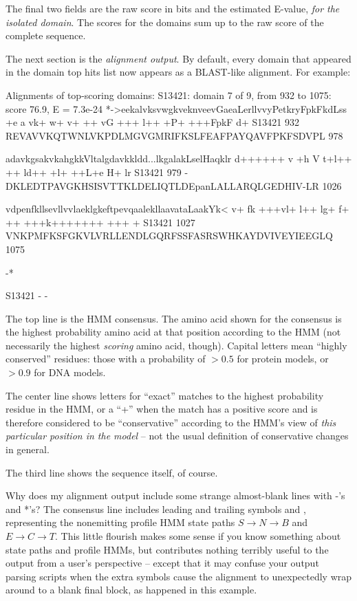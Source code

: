 The final two fields are the raw score in bits and the estimated
E-value, \emph{for the isolated domain}.  The scores for the domains
sum up to the raw score of the complete sequence.

The next section is the \emph{ alignment output}. By default, every
domain that appeared in the domain top hits list now appears as a
BLAST-like alignment. For example:

\begin{sreoutput}
Alignments of top-scoring domains:
S13421: domain 7 of 9, from 932 to 1075: score 76.9, E = 7.3e-24
                   *->eekalvksvwgkveknveevGaeaLerllvvyPetkryFpkFkdLss
                      +e a vk+ w+ v+ ++  vG  +++ l++ +P+ +++FpkF d+  
      S13421   932    REVAVVKQTWNLVKPDLMGVGMRIFKSLFEAFPAYQAVFPKFSDVPL 978  

                   adavkgsakvkahgkkVltalgdavkkldd...lkgalakLselHaqklr
                    d++++++ v +h   V t+l++ ++ ld++ +l+   ++L+e H+  lr
      S13421   979 -DKLEDTPAVGKHSISVTTKLDELIQTLDEpanLALLARQLGEDHIV-LR 1026 

                   vdpenfkllsevllvvlaeklgkeftpevqaalekllaavataLaakYk<
                   v+   fk +++vl+  l++ lg+ f+  ++ +++k+++++++ +++  + 
      S13421  1027 VNKPMFKSFGKVLVRLLENDLGQRFSSFASRSWHKAYDVIVEYIEEGLQ  1075 

                   -*
                     
      S13421     -    -    
\end{sreoutput}

The top line is the HMM consensus. The amino acid shown for the
consensus is the highest probability amino acid at that position
according to the HMM (not necessarily the highest \emph{ scoring} amino
acid, though). Capital letters mean ``highly conserved'' residues:
those with a probability of $> 0.5$ for protein models, or $> 0.9$ for
DNA models. 

The center line shows letters for ``exact'' matches to the highest
probability residue in the HMM, or a ``+'' when the match has a
positive score and is therefore considered to be ``conservative''
according to the HMM's view of \emph{ this particular position in the
model} -- not the usual definition of conservative changes in general.

The third line shows the sequence itself, of course.

\begin{srefaq}{Why does my alignment output include some strange almost-blank
lines with -'s and *'s?}  The consensus line includes leading and
trailing symbols \prog{*->} and \prog{<-*}, representing the
nonemitting profile HMM state paths $S \rightarrow N \rightarrow B$
and $E \rightarrow C \rightarrow T$. This little flourish makes some
sense if you know something about state paths and profile HMMs, but
contributes nothing terribly useful to the output from a user's
perspective -- except that it may confuse your output parsing scripts
when the extra symbols cause the alignment to unexpectedly wrap around
to a blank final block, as happened in this example.
\end{srefaq}

